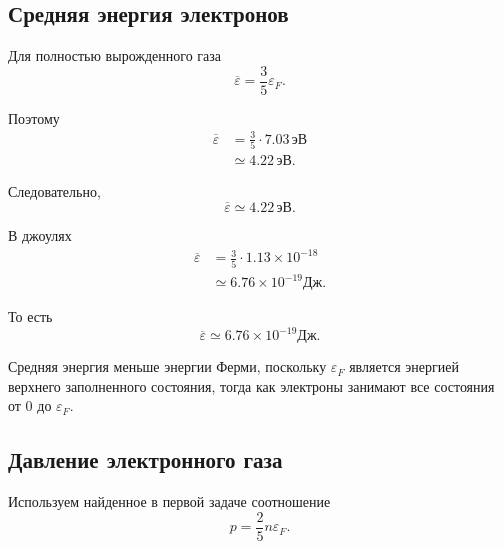 \documentclass[../final.tex]{subfiles}
\begin{document}

\subsection*{Средняя энергия электронов}

Для полностью вырожденного газа
%
\begin{equation*}
    \overline{\varepsilon}
    =
    \frac{3}{5}
    \varepsilon_F.
\end{equation*}

Поэтому
%
\begin{align*}
    \overline{\varepsilon}
    &=
    \frac{3}{5}
    \cdot
    7.03\,\text{эВ}
    \\[3pt]
    &\simeq
    4.22\,\text{эВ}.
\end{align*}

Следовательно,
%
\begin{equation*}
    \boxed{
        \overline{\varepsilon}
        \simeq
        4.22\,\text{эВ}
    }.
\end{equation*}

В джоулях
%
\begin{align*}
    \overline{\varepsilon}
    &=
    \frac{3}{5}
    \cdot
    1.13\times10^{-18}
    \\[3pt]
    &\simeq
    6.76\times10^{-19}
    \text{Дж}.
\end{align*}

То есть
%
\begin{equation*}
    \boxed{
        \overline{\varepsilon}
        \simeq
        6.76\times10^{-19}
        \text{Дж}
    }.
\end{equation*}

Средняя энергия меньше энергии Ферми, поскольку $\varepsilon_F$
является энергией верхнего заполненного состояния, тогда как электроны
занимают все состояния от $0$ до $\varepsilon_F$.



\subsection*{Давление электронного газа}

Используем найденное в первой задаче соотношение
%
\begin{equation*}
    p
    =
    \frac{2}{5}
    n\varepsilon_F.
\end{equation*}
\end{document}
